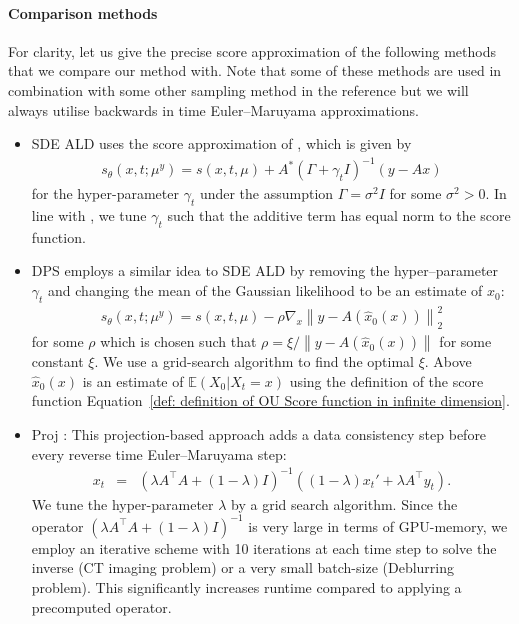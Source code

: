 \documentclass[10pt]{article} %
\def\Eqref#1{Equation~\ref{#1}}
\newcommand{\E}{\mathbb{E}}
\theoremstyle{plain}
\theoremstyle{definition}
\theoremstyle{remark}
\newcommand{\norm}[1]{\left\|#1\right\|}
\begin{document}
\paragraph{Comparison methods}
For clarity, let us give the precise score approximation of the following methods that we compare our method with. Note that some of these methods are used in combination with some other sampling method in the reference but we will always utilise backwards in time Euler--Maruyama approximations.
\begin{itemize}
\item SDE ALD uses the score approximation of \citet{jalal2021robustannealedlangevian}, which is given by
\begin{eqnarray}\label{eq: SDE ALD}
    s_\theta(x, t; \mu^y ) = s(x, t, \mu) + A^* (\Gamma + \gamma_tI)^{-1}(y-Ax)
\end{eqnarray}
for the hyper-parameter $\gamma_t$ under the assumption $\Gamma = \sigma^2 I $ for some $\sigma^2 > 0$.
In line with \citet{feng2023scorebased}, we tune $\gamma_t$ such that the additive term has equal norm to the score function. 
\item DPS \cite{chung2023diffusion} employs a similar idea to SDE ALD by removing the hyper--parameter $\gamma_t$ and changing the mean of the Gaussian likelihood to be an estimate of $x_0$:
\begin{eqnarray*}
    s_\theta(x, t; \mu^y ) = s(x, t, \mu) - \rho\nabla_x \norm{y- A(\hat x_0(x))}_2^2
\end{eqnarray*}
for some $\rho$ which is chosen such that $\rho =\xi / \norm{y- A(\hat x_0(x))}$ for some constant $\xi$. We use a grid-search algorithm to find the optimal $\xi$.
Above $\hat x_0(x)$ is an estimate of $\E(X_0 | X_t = x)$ using the definition of the score function \Eqref{def: definition of OU Score function in infinite dimension}.
\item Proj \cite{Dey_2024}: This projection-based approach adds a data consistency step before every reverse time Euler--Maruyama step:
\begin{eqnarray*}
    x_t &=& (\lambda A^\top A + (1-\lambda)I)^{-1} \left( (1-\lambda )x_t' + \lambda A^\top y_t\right). %
\end{eqnarray*}
We tune the hyper-parameter $\lambda$ by a grid search algorithm. Since the operator $(\lambda A^\top A + (1-\lambda)I)^{-1}$ is very large in terms of GPU-memory, we employ an iterative scheme with 10 iterations at each time step to solve the inverse (CT imaging problem) or a very small batch-size (Deblurring problem). This significantly increases runtime compared to applying a precomputed operator.


\end{itemize}
\end{document}
